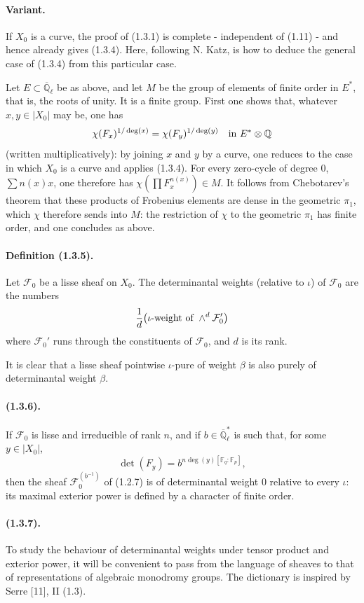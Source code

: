 \documentclass[11pt]{article}
\theoremstyle{remark}
\newcommand{\Qlb}{\overline{\mathbb{Q}}_\ell}
\newcommand{\Fq}{\mathbb{F}_q}
\newcommand{\Fp}{\mathbb{F}_p}
\begin{document}
\paragraph{Variant.} If $X_0$ is a curve, the proof of (1.3.1) is complete - independent of (1.11) - and hence already gives (1.3.4). Here, following N. Katz, is how to deduce the general case of (1.3.4) from this particular case.

Let $E\subset\Qlb$ be as above, and let $M$ be the group of elements of finite order in $E^*$, that is, the roots of unity. It is a finite group. First one shows that, whatever $x,y\in |X_0|$ may be, one has
\[
 \chi(F_x)^{1/\deg(x)}=\chi(F_y)^{1/\deg(y)}\quad\hbox{in }E^*\otimes\mathbb Q
\]
(written multiplicatively): by joining $x$ and $y$ by a curve, one reduces to the case in which $X_0$ is a curve and applies (1.3.4). For every zero-cycle of degree $0$, $\sum n(x)x$, one therefore has $\chi(\prod F_x^{n(x)})\in M$. It follows from Chebotarev's theorem that these products of Frobenius elements are dense in the geometric $\pi_1$, which $\chi$ therefore sends into $M$: the restriction of $\chi$ to the geometric $\pi_1$ has finite order, and one concludes as above.

\paragraph{Definition (1.3.5).} Let $\mathcal F_0$ be a lisse sheaf on $X_0$. The determinantal weights (relative to $\iota$) of $\mathcal F_0$ are the numbers
\[
\frac1d\bigl(\hbox{$\iota$-weight of }\wedge^d \mathcal F_0'\bigr)
\]
where $\mathcal F_0'$ runs through the constituents of $\mathcal F_0$, and $d$ is its rank.

It is clear that a lisse sheaf pointwise $\iota$-pure of weight $\beta$ is also purely of determinantal weight $\beta$.

\paragraph{(1.3.6).} If $\mathcal F_0$ is lisse and irreducible of rank $n$, and if $b\in\Qlb^*$ is such that, for some $y\in |X_0|$,
\[
\det(F_y)=b^{n\deg(y)[\Fq:\Fp]},
\]
then the sheaf $\mathcal F_0^{(b^{-1})}$ of (1.2.7) is of determinantal weight $0$ relative to every $\iota$: its maximal exterior power is defined by a character of finite order.

\paragraph{(1.3.7).} To study the behaviour of determinantal weights under tensor product and exterior power, it will be convenient to pass from the language of sheaves to that of representations of algebraic monodromy groups. The dictionary is inspired by Serre [11], II (1.3).
\end{document}
